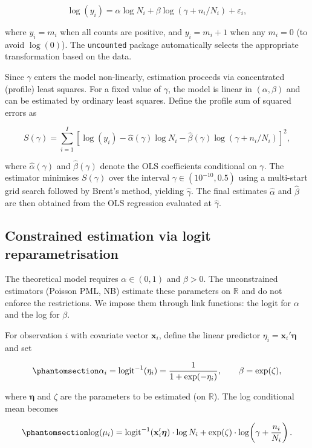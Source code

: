 \[
\log(y_i) = \alpha \log N_i + \beta \log(\gamma + n_i/N_i) + \varepsilon_i,
\]

where $y_i = m_i$ when all counts are positive, and $y_i = m_i + 1$
when any $m_i = 0$ (to avoid $\log(0)$). The \texttt{uncounted}
package automatically selects the appropriate transformation based on
the data.

Since $\gamma$ enters the model non-linearly, estimation proceeds via
concentrated (profile) least squares. For a fixed value of $\gamma$,
the model is linear in $(\alpha, \beta)$ and can be estimated by
ordinary least squares. Define the profile sum of squared errors as

\[
S(\gamma) = \sum_{i=1}^{I} \left[ \log(y_i) - \hat{\alpha}(\gamma) \log N_i - \hat{\beta}(\gamma) \log(\gamma + n_i/N_i) \right]^2,
\]

where $\hat{\alpha}(\gamma)$ and $\hat{\beta}(\gamma)$ denote the
OLS coefficients conditional on $\gamma$. The estimator minimises
$S(\gamma)$ over the interval $\gamma \in (10^{-10}, 0.5)$ using a
multi-start grid search followed by Brent's method, yielding
$\hat{\gamma}$. The final estimates $\hat{\alpha}$ and
$\hat{\beta}$ are then obtained from the OLS regression evaluated at
$\hat{\gamma}$.

\subsection{Constrained estimation via logit
reparametrisation}\label{sec-appendix-constrained}

The theoretical model requires $\alpha \in (0,1)$ and $\beta > 0$.
The unconstrained estimators (Poisson PML, NB) estimate these parameters
on $\mathbb{R}$ and do not enforce the restrictions. We impose them
through link functions: the logit for $\alpha$ and the log for
$\beta$.

For observation $i$ with covariate vector $\mathbf{x}_i$, define the
linear predictor $\eta_i = \mathbf{x}_i' \boldsymbol{\eta}$ and set

\begin{equation}\protect\phantomsection\label{eq-constrained-link}{
\alpha_i = \text{logit}^{-1}(\eta_i) = \frac{1}{1 + \exp(-\eta_i)}, \qquad \beta = \exp(\zeta),
}\end{equation}

where $\boldsymbol{\eta}$ and $\zeta$ are the parameters to be
estimated (on $\mathbb{R}$). The log conditional mean becomes

\begin{equation}\protect\phantomsection\label{eq-constrained-logmu}{
\log(\mu_i) = \text{logit}^{-1}(\mathbf{x}_i' \boldsymbol{\eta}) \cdot \log N_i + \exp(\zeta) \cdot \log\!\left(\gamma + \frac{n_i}{N_i}\right).
}\end{equation}

